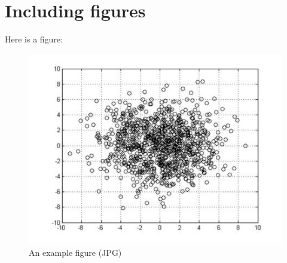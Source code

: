 \documentclass[preprint,12pt]{elsarticle}
\begin{document}
\section{Including figures}
\label{s:another-section}
Here is a figure:
\begin{figure}[ht]
    \centerline{\includegraphics[scale=0.8]{figs/clus1.jpg}}
    \caption{An example figure (JPG)}
\end{figure}






%


\end{document}

